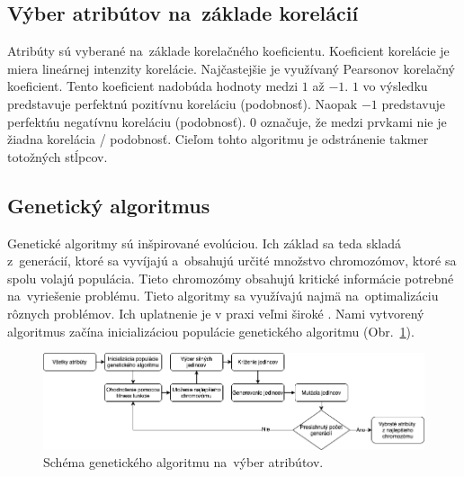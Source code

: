 \documentclass[runningheads]{llncs}
\begin{document}
\subsection{Výber atribútov na~základe korelácií}
Atribúty sú vyberané na~základe korelačného koeficientu. Koeficient korelácie je miera lineárnej intenzity 
korelácie. Najčastejšie je využívaný Pearsonov korelačný koeficient. Tento koeficient nadobúda hodnoty medzi
\begin{math}1\end{math} až \begin{math}-1\end{math}. \begin{math}1\end{math} vo výsledku predstavuje perfektnú pozitívnu 
koreláciu (podobnosť). Naopak \begin{math}-1\end{math} predstavuje 
perfektńu negatívnu koreláciu (podobnosť). \begin{math}0\end{math} označuje, že medzi prvkami nie je žiadna korelácia / podobnosť.
Cieľom tohto algoritmu je odstránenie takmer totožných stĺpcov.\cite{ref_xu}

\subsection{Genetický algoritmus}

Genetické algoritmy sú inšpirované evolúciou. Ich základ sa teda skladá z~generácií, ktoré sa vyvíjajú a~obsahujú 
určité množstvo chromozómov, ktoré sa spolu volajú populácia. Tieto chromozómy obsahujú kritické informácie 
potrebné na~vyriešenie problému. Tieto algoritmy sa využívajú najmä na~optimalizáciu rôznych
problémov. Ich uplatnenie je v praxi veľmi široké \cite{ref_babatunde,ref_whitley}. Nami vytvorený algoritmus začína 
inicializáciou populácie genetického algoritmu (Obr.~\ref{fig_ga_rozdelenie}).
\begin{figure}
\includegraphics[width=\textwidth]{image/GA_alg.png}
\caption{Schéma genetického algoritmu na~výber atribútov.} \label{fig_ga_rozdelenie}
\end{figure}
    
\end{document}
